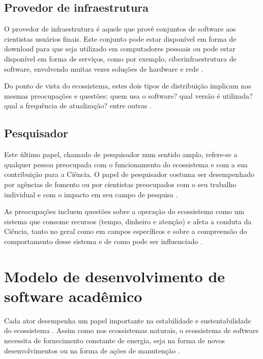 \subsection{Provedor de infraestrutura}

O provedor de infraestrutura é aquele que provê conjuntos de software aos
cientistas usuários finais. Este conjunto pode estar disponível em forma de
download para que seja utilizado em computadores pessoais ou pode estar
disponível em forma de serviços, como por exemplo, ciberinfraestrutura
de software, envolvendo muitas vezes soluções de hardware e rede \cite{council2007cyberinfrastructure, stewart2010cyberinfrastructure}.

Do ponto de vista do ecossistema, estes dois tipos de distribuição implicam nas
mesmas preocupações e questões: quem usa o software? qual versão é utilizada? 
qual a frequência de atualização? entre outras \cite{howison2015understanding}.

\subsection{Pesquisador}

Este último papel, chamado de pesquisador num sentido amplo, refere-se a
qualquer pessoa preocupada com o funcionamento do ecossistema e com a sua
contribuição para a Ciência. O papel de pesquisador costuma ser desempenhado
por agências de fomento ou por cientistas preocupados com o seu trabalho
individual e com o impacto em seu campo de pesquisa
\cite{howison2015understanding}.

As preocupações incluem questões sobre a operação do ecossistema
como um sistema que consome recursos (tempo, dinheiro e atenção) e afeta a
conduta da Ciência, tanto no geral como em campos específicos
e sobre a compreensão do comportamento desse sistema e de 
como pode ser influenciado \cite{howison2015understanding}.

\section{Modelo de desenvolvimento de software acadêmico}
\label{sec:modelosa}

Cada ator desempenha um papel importante na estabilidade e sustentabilidade do
ecossistema \cite{dhungana2010software}. Assim como nos ecossistemas naturais,
o ecossistema de software necessita de fornecimento constante de energia, seja
na forma de novos desenvolvimentos ou na forma de ações de manutenção
\cite{dhungana2010software}.

